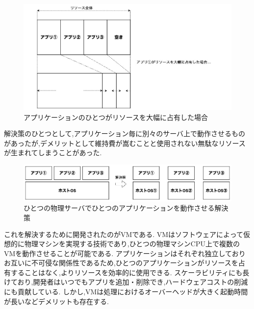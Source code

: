 \begin{figure}[htbp]
\begin{center}
    \includegraphics[width=\textwidth]{./figures/resource-on-physical-server.jpg}
    \caption{アプリケーションのひとつがリソースを大幅に占有した場合}
\end{center}
\end{figure}

解決策のひとつとして,アプリケーション毎に別々のサーバ上で動作させるものがあったが,デメリットとして維持費が嵩むことと使用されない無駄なリソースが生まれてしまうことがあった.

\begin{figure}[htbp]
\begin{center}
    \includegraphics[width=\textwidth]{./figures/only-on-physical-server.jpg}
    \caption{ひとつの物理サーバでひとつのアプリケーションを動作させる解決策}
\end{center}
\end{figure}

これを解決するために開発されたのがVMである.
VMはソフトウェアによって仮想的に物理マシンを実現する技術であり,ひとつの物理マシンCPU上で複数のVMを動作させることが可能である.
アプリケーションはそれぞれ独立しておりお互いに不可侵な関係性であるため,ひとつのアプリケーションがリソースを占有することはなく,よりリソースを効率的に使用できる.
スケーラビリティにも長けており,開発者はいつでもアプリを追加・削除でき,ハードウェアコストの削減にも貢献している.
しかし,VMは処理におけるオーバーヘッドが大きく起動時間が長いなどデメリットも存在する.

